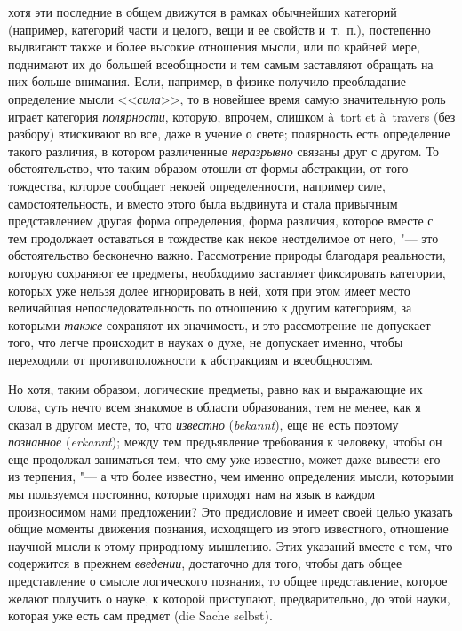 хотя эти последние в общем движутся в рамках обычнейших категорий
(например, категорий части и целого, вещи и ее свойств и~т.~п.), постепенно
выдвигают также и более высокие отношения мысли, или по крайней мере,
поднимают их до большей всеобщности и тем самым заставляют обращать на них
больше внимания. Если, например, в физике получило преобладание определение
мысли <<{\em сила}>>, то в новейшее время самую
значительную роль играет категория {\em полярности},
которую, впрочем, слишком à~tort et à~travers (без разбору) втискивают во
все, даже в учение о свете;
полярность есть определение такого различия, в котором различенные
{\em неразрывно} связаны друг с другом. То
обстоятельство, что таким образом отошли от формы абстракции, от того
тождества, которое сообщает некоей определенности, например силе,
самостоятельность, и вместо этого была выдвинута и стала привычным
представлением другая форма определения, форма различия, которое вместе с
тем продолжает оставаться в тождестве как некое неотделимое от него, "--- это
обстоятельство бесконечно важно. Рассмотрение природы благодаря реальности,
которую сохраняют ее предметы, необходимо заставляет фиксировать категории,
которых уже нельзя долее игнорировать в ней, хотя при этом имеет место
величайшая непоследовательность по отношению к другим категориям, за
которыми {\em также} сохраняют их значимость, и это
рассмотрение не допускает того, что легче происходит в науках о духе, не
допускает именно, чтобы переходили от противоположности к абстракциям и
всеобщностям.

Но хотя, таким образом, логические предметы, равно как и выражающие их
слова, суть нечто всем знакомое в области образования, тем не менее, как я
сказал в другом месте, то, что {\em известно}
({\em bekannt}), еще не есть поэтому {\em познанное} ({\em erkannt});
между тем предъявление требования к человеку, чтобы он еще продолжал
заниматься тем, что ему уже известно, может даже вывести его из терпения, "---
а что более известно, чем именно определения мысли, которыми мы пользуемся
постоянно, которые приходят нам на язык в каждом произносимом нами
предложении? Это предисловие и имеет своей целью указать общие моменты
движения познания, исходящего из этого известного, отношение научной мысли
к этому природному мышлению. Этих указаний вместе с тем, что содержится в
прежнем {\em введении}, достаточно для того, чтобы дать
общее представление о смысле логического познания, то общее представление,
которое желают получить о науке, к которой приступают, предварительно, до
этой науки, которая уже есть сам предмет (die Sache selbst).

